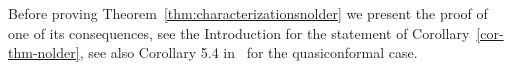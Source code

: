 \documentclass[11pt,a4paper,reqno]{amsart}
\theoremstyle{definition}
\newtheorem{remark}[theorem]{Remark}
\renewcommand{\a}{\operatorname{a}}
\newcommand{\B}{\mathbb{B}^n}
\newcommand{\R}{\mathbb{R}}
\newcommand{\ud}{\mathrm {d}}
\newcommand{\Leb}{\mathrm {d}{\mathcal L}^{n}}
\newcommand{\blue}{\color{blau}}
\newcounter{komcounter}
\numberwithin{komcounter}{section}
\newcommand{\komT}[1]{{\bf \blue [\refstepcounter{komcounter}\thekomcounter (by T): #1]}}
\begin{document}
%
%

Before proving Theorem~\ref{thm:characterizationsnolder} we present the proof of one of its consequences, see the Introduction for the statement of Corollary~\ref{cor-thm-nolder}, see also Corollary 5.4 in~\cite{ak} for the quasiconformal case. 
\end{document}
